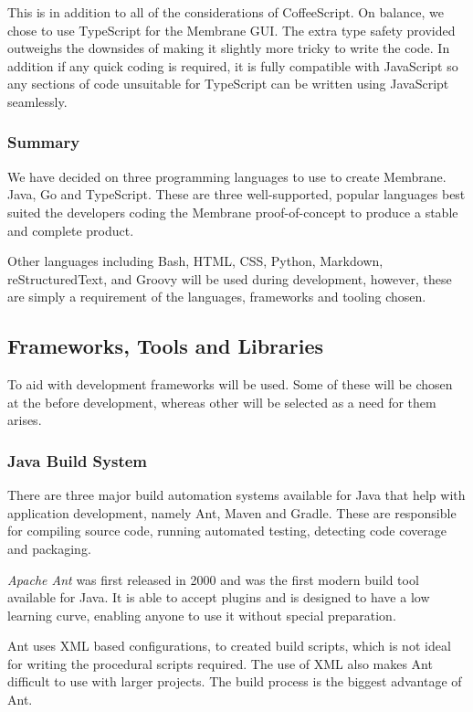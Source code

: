 \documentclass[11pt, a4paper, twoside]{report}
\begin{document}
This is in addition to all of the considerations of CoffeeScript. On balance, we chose to use TypeScript for the Membrane GUI. The extra type safety provided outweighs the downsides of making it slightly more tricky to write the code. In addition if any quick coding is required, it is fully compatible with JavaScript so any sections of code unsuitable for TypeScript can be written using JavaScript seamlessly.

\subsubsection{Summary}

We have decided on three programming languages to use to create Membrane. Java, Go and TypeScript. These are three well-supported, popular languages best suited the developers coding the Membrane proof-of-concept to produce a stable and complete product.

Other languages including Bash, HTML, CSS, Python, Markdown, reStructuredText, and Groovy will be used during development, however, these are simply a requirement of the languages, frameworks and tooling chosen.

\subsection{Frameworks, Tools and Libraries}

To aid with development frameworks will be used. Some of these will be chosen at the before development, whereas other will be selected as a need for them arises.

\subsubsection{Java Build System}

There are three major build automation systems available for Java that help with application development, namely Ant, Maven and Gradle. These are responsible for compiling source code, running automated testing, detecting code coverage and packaging.

\emph{Apache Ant} was first released in 2000 and was the first modern build tool available for Java. It is able to accept plugins and is designed to have a low learning curve, enabling anyone to use it without special preparation.

Ant uses XML based configurations, to created build scripts, which is not ideal for writing the procedural scripts required. The use of XML also makes Ant difficult to use with larger projects. The build process is the biggest advantage of Ant.
\end{document}
